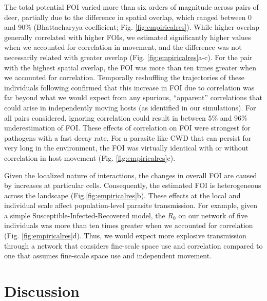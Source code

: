 \documentclass[letterpaper]{article}
\begin{document}
The total potential FOI varied more than six orders of magnitude across pairs of deer, partially due to the difference in spatial overlap, which ranged between 0 and 90\% (Bhattacharyya coefficient; Fig. \ref{fig:empiricalres}). While higher overlap generally correlated with higher FOIs, we estimated significantly higher values when we accounted for correlation in movement, and the difference was not necessarily related with greater overlap (Fig. \ref{fig:empiricalres}a-c).  For the pair with the highest spatial overlap, the FOI was more than ten times greater when we accounted for correlation. Temporally reshuffling the trajectories of these individuals following \cite{Spiegel2016} confirmed that this increase in FOI due to correlation was far beyond what we would expect from any  spurious, ``apparent'' correlations that could arise in independently moving hosts (as identified in our simulations). For all pairs considered, ignoring correlation could result in between 5\% and 96\% underestimation of FOI. These effects of correlation on FOI were strongest for pathogens with a fast decay rate. For a parasite like CWD that can persist for very long in the environment, the FOI was virtually identical with or without correlation in host movement (Fig. \ref{fig:empiricalres}c). 

Given the localized nature of interactions, the changes in overall FOI are caused by increases at particular cells. Consequently, the estimated FOI is heterogeneous across the landscape (Fig.\ref{fig:empiricalres}b). These effects at the local and individual scale affect population-level parasite transmission. For example, given a simple Susceptible-Infected-Recovered model, the $R_0$ on our network of five individuals was more than ten times greater when we accounted for correlation (Fig. \ref{fig:empiricalres}d). Thus, we would expect more explosive transmission through a network that considers fine-scale space use and correlation compared to one that assumes fine-scale space use and independent movement.

\section*{Discussion}
\end{document}
